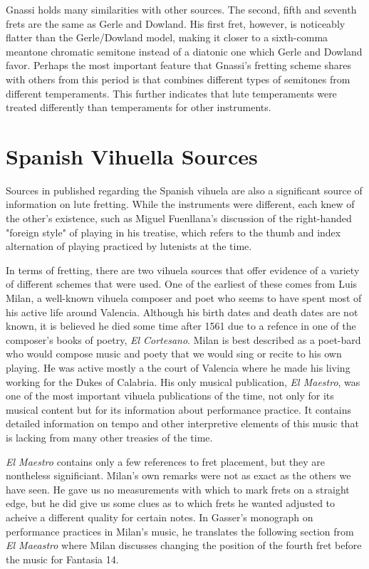 Gnassi holds many similarities with other sources.  The second, fifth and
seventh frets are the same as Gerle and Dowland.  His first fret, however, is noticeably
flatter than the Gerle/Dowland model, making it closer to a sixth-comma meantone
chromatic semitone instead of a diatonic one which Gerle and Dowland favor. Perhaps
the most important feature that Gnassi's fretting scheme shares with others from this period
is that combines different types of
semitones from different temperaments.  This further indicates that lute temperaments were treated
differently than temperaments for other instruments.


\section{Spanish Vihuella Sources}

Sources in published regarding the Spanish vihuela are also a significant source of information
on lute fretting.  While the instruments were different, each knew of the other's existence,
such as Miguel Fuenllana's discussion of the right-handed "foreign style" of playing in his
treatise, which refers to the thumb and index alternation of playing practiced by lutenists
at the time.

In terms of fretting, there are two vihuela sources that offer evidence of a variety of
different schemes that were used. One of the
earliest of these comes from Luis Milan, a well-known vihuela composer and poet who seems
to have spent most of his
active life around Valencia.  Although his birth dates and death dates are not known, it
is believed he died some time after 1561 due to a refence in one of the composer's books of
poetry, \textit{El Cortesano}.\autocite[6]{LG:1}  Milan is best described as a poet-bard who would compose
music and poety that we would sing or recite to his own playing.  He was active mostly a the
court of Valencia where he made his living working for the Dukes of Calabria.
His only musical publication, \textit{El Maestro}, was one of the most important vihuela
publications of the time, not only for its musical content but for its information about
performance practice.  It contains detailed information on tempo and other interpretive
elements of this music that is lacking from many other treasies of the time.

\textit{El Maestro} contains only a few references to fret placement, but they are nontheless
significiant.  Milan's own remarks were not as exact as the others we have seen.  He gave us no
measurements with which to mark frets on a straight edge, but he did give us some clues as to
which frets he wanted adjusted to acheive a
different quality for certain notes.  In Gasser's monograph on performance practices in
Milan's music, he translates the following section from \textit{El Maeastro} where
Milan discusses changing the position of the fourth fret before the music for Fantasia 14.

